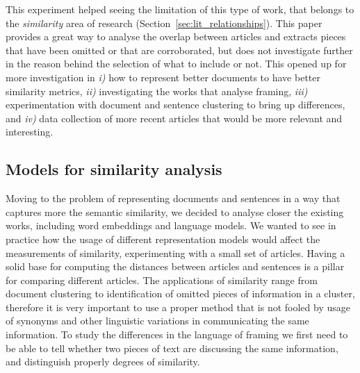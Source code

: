 

This experiment helped seeing the limitation of this type of work, that belongs to the \emph{similarity} area of research (Section~\ref{sec:lit_relationships}).
This paper provides a great way to analyse the overlap between articles and extracts pieces that have been omitted or that are corroborated, but does not investigate further in the reason behind the selection of what to include or not.
This opened up for more investigation in \emph{i)} how to represent better documents to have better similarity metrics, \emph{ii)} investigating the works that analyse framing, \emph{iii)} experimentation with document and sentence clustering to bring up differences, and \emph{iv)} data collection of more recent articles that would be more relevant and interesting.


\subsection{Models for similarity analysis}
Moving to the problem of representing documents and sentences in a way that captures more the semantic similarity, we decided to analyse closer the existing works, including word embeddings and language models.
We wanted to see in practice how the usage of different representation models would affect the measurements of similarity, experimenting with a small set of articles. 
Having a solid base for computing the distances between articles and sentences is a pillar for comparing different articles. The applications of similarity range from document clustering to identification of omitted pieces of information in a cluster, therefore it is very important to use a proper method that is not fooled by usage of synonyms and other linguistic variations in communicating the same information. To study the differences in the language of framing we first need to be able to tell whether two pieces of text are discussing the same information, and distinguish properly degrees of similarity.

